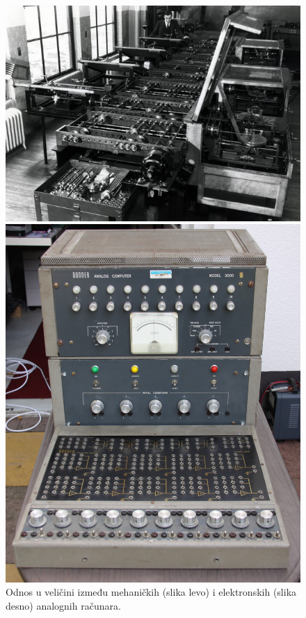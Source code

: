 \documentclass[a4paper]{article}
\begin{document}
	\bigskip
	
	\begin{figure}[!h]
		\begin{minipage}[h]{2 in}
			\centering
			\includegraphics[scale = 0.2]{mehanicki.jpg}
		\end{minipage}
		\hfill
		\begin{minipage}[h]{2in}
			\centering
			\includegraphics[scale = 0.067]{elektronski.jpg}
		\end{minipage}
		
		\caption{Odnos u veličini između mehaničkih (slika levo) i elektronskih (slika desno) analognih  računara.}
		\label{fig:aVSe}
	\end{figure}
	
\end{document}
